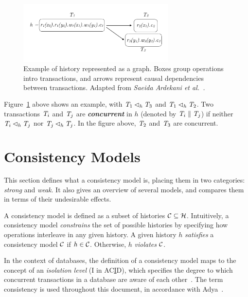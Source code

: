 \begin{figure}[h]
  \centering
  \vspace{-0.4cm}
  \includegraphics[width=0.7\textwidth]{figures/history.pdf}
  \vspace{-1cm}
  \caption{Example of history represented as a graph. Boxes group operations intro transactions, and arrows represent causal dependencies between transactions. Adapted from \em{Saeida Ardekani et al.~\citep{ardekani_nmsi}}.}
  \label{fig:history}
\end{figure}

Figure~\ref{fig:history} above shows an example, with $\mathit{T}_1 \lhd_h \mathit{T}_3$ and $\mathit{T}_1 \lhd_h \mathit{T}_2$. Two transactions $\mathit{T}_i$ and $\mathit{T}_j$ are \textbf{\em concurrent} in $h$ (denoted by $\mathit{T}_i \parallel \mathit{T}_j$) if neither $\mathit{T}_i \lhd_h \mathit{T}_j$ nor $\mathit{T}_j \lhd_h \mathit{T}_j$. In the figure above, $\mathit{T}_2$ and $\mathit{T}_3$ are concurrent.

\section{Consistency Models}

This section defines what a consistency model is, placing them in two categories: \emph{strong} and \emph{weak}. It also gives an overview of several models, and compares them in terms of their undesirable effects.

A consistency model is defined as a subset of histories $\mathcal{C} \subseteq \mathcal{H}$. Intuitively, a consistency model \emph{constrains} the set of possible histories by specifying how operations interleave in any given history. A given history $h$ \emph{satisfies} a consistency model $\mathcal{C}$ if $h \in \mathcal{C}$. Otherwise, $h$ \emph{violates} $\mathcal{C}$.

In the context of databases, the definition of a consistency model maps to the concept of an \emph{isolation level} (I in AC\underline{I}D), which specifies the degree to which concurrent transactions in a database are aware of each other~\citep{adya_thesis}. The term consistency is used throughout this document, in accordance with Adya~\citep{adya_thesis}.

